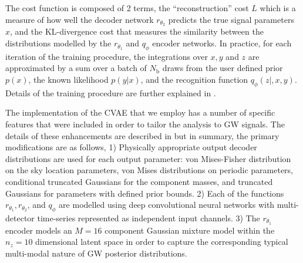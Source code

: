 \documentclass{article}
\begin{document}
The cost function is composed of 2 terms, the ``reconstruction'' cost $L$ which
is a measure of how well the decoder network $r_{\theta_2}$ predicts the true
signal parameters $x$, and the \ac{KL}-divergence cost that measures the
similarity between the distributions modelled by the $r_{\theta_1}$ and
$q_{\phi}$ encoder networks. In practice, for each iteration of the training
procedure, the integrations over $x,y$ and $z$ are approximated by a sum over a
batch of $N_{\text{b}}$ draws from the user defined prior $p(x)$, the known
likelihood $p(y|x)$, and the recognition function $q_{\phi}(z|,x,y)$. Details
of the training procedure are further explained in \cite{1909.06296}.  

%
%
The implementation of the \ac{CVAE} that we employ has a
number of specific features that were included in order to tailor the analysis to
\ac{GW} signals. The details of these enhancements are described in \cite{1909.06296} but in summary, the primary modifications are as follows, 1) Physically 
appropriate output decoder distributions are used for each output parameter: 
von Mises-Fisher distribution on the sky location parameters, von Mises 
distributions on periodic parameters, conditional truncated Gaussians for 
the component masses, and truncated Gaussians for
parameters with defined prior bounds. 2) Each of the
functions $r_{\theta_1},r_{\theta_2}$, and $q_{\phi}$ are modelled using deep
convolutional neural networks with multi-detector time-series represented as
independent input channels. 3) The $r_{\theta_1}$ encoder models an $M=16$ component
Gaussian mixture model within the $n_{z}=10$ dimensional latent space in order
to capture the corresponding typical multi-modal nature of \ac{GW} posterior
distributions.  
\end{document}
